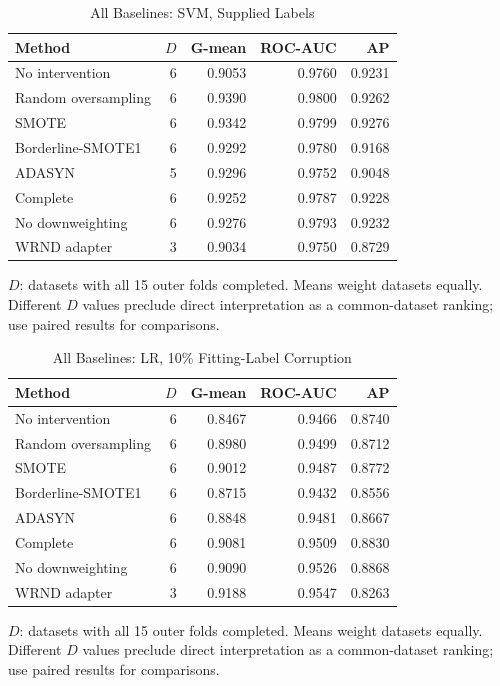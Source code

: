 \begin{table}[t]
\caption{All Baselines: SVM, Supplied Labels}
\label{tab:all_baselines_svm_0}
\centering\small
\begin{tabular}{lrrrr}
\hline
Method & $D$ & G-mean & ROC-AUC & AP\\
\hline
No intervention & 6 & 0.9053 & 0.9760 & 0.9231 \\
Random oversampling & 6 & 0.9390 & 0.9800 & 0.9262 \\
SMOTE & 6 & 0.9342 & 0.9799 & 0.9276 \\
Borderline-SMOTE1 & 6 & 0.9292 & 0.9780 & 0.9168 \\
ADASYN & 5 & 0.9296 & 0.9752 & 0.9048 \\
Complete & 6 & 0.9252 & 0.9787 & 0.9228 \\
No downweighting & 6 & 0.9276 & 0.9793 & 0.9232 \\
WRND adapter & 3 & 0.9034 & 0.9750 & 0.8729 \\
\hline
\end{tabular}
\par\smallskip\footnotesize $D$: datasets with all 15 outer folds completed. Means weight datasets equally. Different $D$ values preclude direct interpretation as a common-dataset ranking; use paired results for comparisons.
\end{table}

\begin{table}[t]
\caption{All Baselines: LR, 10\% Fitting-Label Corruption}
\label{tab:all_baselines_lr_10}
\centering\small
\begin{tabular}{lrrrr}
\hline
Method & $D$ & G-mean & ROC-AUC & AP\\
\hline
No intervention & 6 & 0.8467 & 0.9466 & 0.8740 \\
Random oversampling & 6 & 0.8980 & 0.9499 & 0.8712 \\
SMOTE & 6 & 0.9012 & 0.9487 & 0.8772 \\
Borderline-SMOTE1 & 6 & 0.8715 & 0.9432 & 0.8556 \\
ADASYN & 6 & 0.8848 & 0.9481 & 0.8667 \\
Complete & 6 & 0.9081 & 0.9509 & 0.8830 \\
No downweighting & 6 & 0.9090 & 0.9526 & 0.8868 \\
WRND adapter & 3 & 0.9188 & 0.9547 & 0.8263 \\
\hline
\end{tabular}
\par\smallskip\footnotesize $D$: datasets with all 15 outer folds completed. Means weight datasets equally. Different $D$ values preclude direct interpretation as a common-dataset ranking; use paired results for comparisons.
\end{table}

